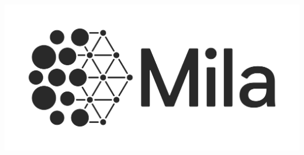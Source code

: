 \documentclass[portrait,a0b,final,a4resizeable]{a0poster}
\begin{document}
\begin{poster}
{    \begin{minipage}[c][0.1\paperheight][c]{0.33\textwidth}\includegraphics[height=4in]{../figures/mila.png} \end{minipage}
    }
\end{poster}
\end{document}
